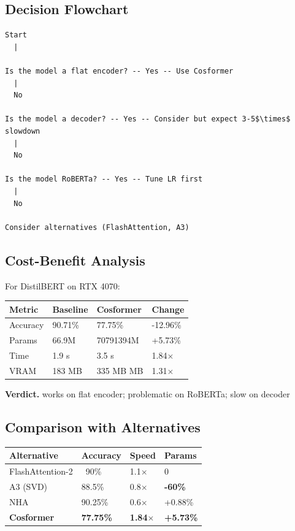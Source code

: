 \subsection{Decision Flowchart}

\begin{lstlisting}
Start
  |
   
Is the model a flat encoder? -- Yes -- Use Cosformer
  |
  No
   
Is the model a decoder? -- Yes -- Consider but expect 3-5$\times$ slowdown
  |
  No
   
Is the model RoBERTa? -- Yes -- Tune LR first
  |
  No
   
Consider alternatives (FlashAttention, A3)
\end{lstlisting}

\subsection{Cost-Benefit Analysis}

For DistilBERT on RTX 4070:

\begin{table}[H]
\centering
\small
\begin{tabular}{llll}
\toprule
\textbf{Metric} & \textbf{Baseline} & \textbf{Cosformer} & \textbf{Change} \\
\midrule
Accuracy & 90.71\% & 77.75\% & -12.96\% \\
Params & 66.9M & 70791394M & +5.73\% \\
Time & 1.9 s & 3.5 s & 1.84$\times$ \\
VRAM & 183 MB & 335 MB MB & 1.31$\times$ \\
\bottomrule
\end{tabular}
\end{table}

\textbf{Verdict.} works on flat encoder; problematic on RoBERTa; slow on decoder

\subsection{Comparison with Alternatives}

\begin{table}[H]
\centering
\small
\begin{tabular}{llll}
\toprule
\textbf{Alternative} & \textbf{Accuracy} & \textbf{Speed} & \textbf{Params} \\
\midrule
FlashAttention-2 & ~90\% & 1.1$\times$ & 0 \\
A3 (SVD) & 88.5\% & 0.8$\times$ & \textbf{-60\%} \\
NHA & 90.25\% & 0.6$\times$ & +0.88\% \\
\textbf{Cosformer} & \textbf{77.75\%} & \textbf{1.84$\times$} & \textbf{+5.73\%} \\
\bottomrule
\end{tabular}
\end{table}


